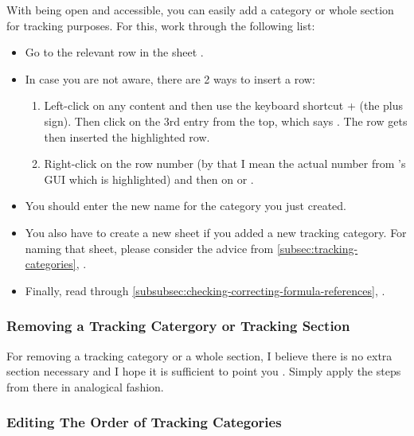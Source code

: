 With \tfn being open and accessible, you can easily add a category or whole section for tracking purposes.
For this, work through the following list:
\begin{itemize}
	\item Go to the relevant row in the sheet .
	\item In case you are not aware, there are 2 ways to insert a row:
	\begin{enumerate}
		\item Left-click on any content and then use the keyboard shortcut +\keystroke{+} (the plus sign).
		Then click on the 3rd entry from the top, which says .
		The row gets then inserted  the highlighted row.
		\item Right-click on the row number (by that I mean the actual number from \loc's GUI which is highlighted) and then on  or .
	\end{enumerate}
	\item You should enter the new name for the category you just created.
	\item You also have to create a new sheet if you added a new tracking category.
	For naming that sheet, please consider the advice from \autoref{subsec:tracking-categories}, .
	\item Finally, read through \autoref{subsubsec:checking-correcting-formula-references}, .
\end{itemize}

\subsubsection{Removing a Tracking Catergory or Tracking Section}
\label{subsubsec:removing-a-tracking-category-section}

For removing a tracking category or a whole section, I believe there is no extra section necessary and I hope it is sufficient to point you .
Simply apply the steps from there in analogical fashion.

\subsubsection{Editing The Order of Tracking Categories}
\label{subsec:editing-order-of-tracking-categories}

